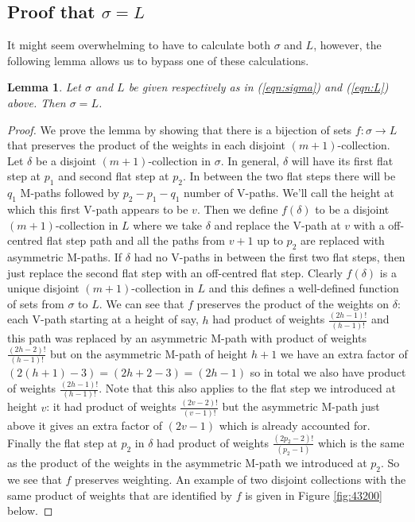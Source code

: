\documentclass[11pt]{article}
\theoremstyle{mythm}
\newtheorem{lem}[defn]{Lemma}
\begin{document}
\subsection{Proof that $\sigma = L$}

It might seem overwhelming to have to calculate both $\sigma$ and $L$, however, the following lemma allows us to bypass one of these calculations.

\begin{lem}\label{lem:sigma=L}
Let $\sigma$ and $L$ be given respectively as in (\ref{eqn:sigma}) and (\ref{eqn:L}) above. Then $\sigma = L$. 
\end{lem}

\begin{proof}
We prove the lemma by showing that there is a bijection of sets $f:\sigma \to L$ that preserves the product of the weights in each disjoint $(m+1)$-collection. Let $\delta$ be a disjoint $(m+1)$-collection in $\sigma$. In general, $\delta$ will have its first flat step at $p_1$ and second flat step at $p_2$. In between the two flat steps there will be $q_1$ M-paths followed by $p_2-p_1-q_1$ number of V-paths. We'll call the height at which this first V-path appears to be $v$. Then we define $f(\delta)$ to be a disjoint $(m+1)$-collection in $L$ where we take $\delta$ and replace the V-path at $v$ with a off-centred flat step path and all the paths from $v+1$ up to $p_2$ are replaced with asymmetric M-paths. If $\delta$ had no V-paths in between the first two flat steps, then just replace the second flat step with an off-centred flat step. Clearly $f(\delta)$ is a unique disjoint $(m+1)$-collection in $L$ and this defines a well-defined function of sets from $\sigma$ to $L$. We can see that $f$ preserves the product of the weights on $\delta$: each V-path starting at a height of say, $h$ had product of weights $\frac{(2h-1)!}{(h-1)!}$ and this path was replaced by an asymmetric M-path with product of weights $\frac{(2h-2)!}{(h-1)!}$ but on the asymmetric M-path of height $h+1$ we have an extra factor of $(2(h+1)-3) = (2h+2-3) = (2h-1)$ so in total we also have product of weights $\frac{(2h-1)!}{(h-1)!}$. Note that this also applies to the flat step we introduced at height $v$: it had product of weights $\frac{(2v-2)!}{(v-1)!}$ but the asymmetric M-path just above it gives an extra factor of $(2v-1)$ which is already accounted for. Finally the flat step at $p_2$ in $\delta$ had product of weights $\frac{(2p_2-2)!}{(p_2-1)}$ which is the same as the product of the weights in the asymmetric M-path we introduced at $p_2$. So we see that $f$ preserves weighting. An example of two disjoint collections with the same product of weights that are identified by $f$ is given in Figure \ref{fig:43200} below.


\end{proof}
\end{document}
